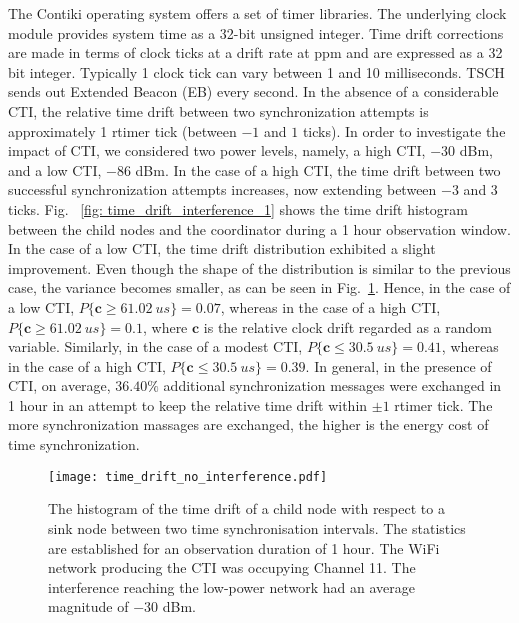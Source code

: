 The Contiki operating system offers a set of timer libraries. The underlying clock module provides system time as a 32-bit unsigned integer. Time drift corrections are made in terms of clock ticks at a drift rate at ppm and are expressed as a 32 bit integer. Typically 1 clock tick can vary between 1 and 10 milliseconds. TSCH sends out Extended Beacon (EB) every second. In the absence of a considerable CTI, the relative time drift between two synchronization attempts is approximately 1 rtimer tick (between $-1$ and $1$ ticks). In order to investigate the impact of CTI, we considered two power levels, namely, a high CTI, $-30$ dBm, and a low CTI,  $-86$ dBm. In the case of a high CTI, the time drift between two successful synchronization attempts increases, now extending between $-3$ and $3$ ticks. Fig.~ \ref{fig: time_drift_interference_1} shows the time drift histogram between the child nodes and the coordinator during a 1 hour observation window. In the case of a low CTI, the time drift distribution exhibited a slight improvement. Even though the shape of the distribution is similar to the previous case, the variance becomes smaller, as can be seen in Fig.~\ref{fig: time_drift_interference_2}. Hence, in the case of a low CTI, $P\{\mathbf{c} \geq 61.02 \ us\} = 0.07$, whereas in the case of a high CTI, $P\{\mathbf{c} \geq 61.02 \ us\} = 0.1$, where $\mathbf{c}$ is the relative clock drift regarded as a random variable. Similarly, in the case of a modest CTI, $P\{\mathbf{c} \leq 30.5 \ us\} = 0.41$, whereas in the case of a high CTI,  $P\{\mathbf{c} \leq 30.5 \ us\} = 0.39$. In general, in the presence of CTI, on average, $36.40\%$ additional synchronization messages were exchanged in 1 hour in an attempt to keep the relative time drift within $\pm 1$ rtimer tick. The more synchronization massages are exchanged, the higher is the energy cost of time synchronization. 

\begin{figure}[h!]
    \centering
    \texttt{[image: time\_drift\_no\_interference.pdf]} 
            	\caption{The histogram of the time drift of a child node with respect to a sink node between two time synchronisation intervals. The statistics are established for an observation duration of 1 hour. The WiFi network producing the CTI was occupying Channel 11. The interference reaching the low-power network had an average magnitude of $-30$ dBm.} 
    \label{fig: time_drift_interference_2}
\end{figure}  
